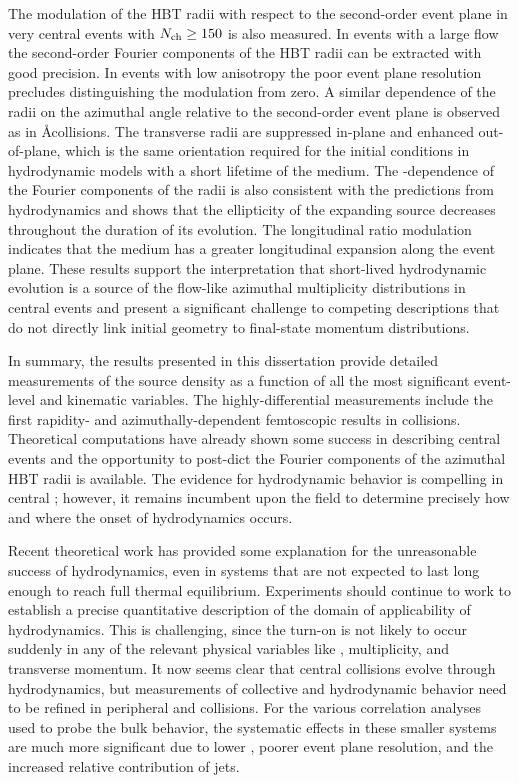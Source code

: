 The modulation of the \ac{HBT} radii with respect to the second-order event plane in very central \pPb events with $\mbox{$N_{\mathrm{ch}}$} \geq 150$ is also measured.
In events with a large flow the second-order Fourier components of the \ac{HBT} radii can be extracted with good precision.
In events with low anisotropy the poor event plane resolution precludes distinguishing the modulation from zero.
A similar dependence of the radii on the azimuthal angle relative to the second-order event plane is observed as in \AA collisions.
The transverse radii are suppressed in-plane and enhanced out-of-plane, which is the same orientation required for the initial conditions in hydrodynamic models with a short lifetime of the medium.
The \kt-dependence of the Fourier components of the radii is also consistent with the predictions from hydrodynamics and shows that the ellipticity of the expanding source decreases throughout the duration of its evolution.
The longitudinal ratio \Rlong modulation indicates that the medium has a greater longitudinal expansion along the event plane.
These results support the interpretation that short-lived hydrodynamic evolution is a source of the flow-like azimuthal multiplicity distributions in central \pPb events and present a significant challenge to competing descriptions that do not directly link initial geometry to final-state momentum distributions.

In summary, the results presented in this dissertation provide detailed measurements of the \pPb source density as a function of all the most significant event-level and kinematic variables.
The highly-differential measurements include the first rapidity- and azimuthally-dependent femtoscopic results in \pA collisions.
Theoretical computations have already shown some success in describing central \pPb events and the opportunity to post-dict the Fourier components of the azimuthal \ac{HBT} radii is available.
The evidence for hydrodynamic behavior is compelling in central \pPb; however, it remains incumbent upon the field to determine precisely how and where the onset of hydrodynamics occurs.


Recent theoretical work has provided some explanation for the unreasonable success of hydrodynamics, even in systems that are not expected to last long enough to reach full thermal equilibrium.
Experiments should continue to work to establish a precise quantitative description of the domain of applicability of hydrodynamics.
This is challenging, since the turn-on is not likely to occur suddenly in any of the relevant physical variables like \Npart, multiplicity, and transverse momentum.
It now seems clear that central \pPb collisions evolve through hydrodynamics, but measurements of collective and hydrodynamic behavior need to be refined in peripheral \pPb and \pp collisions.
For the various correlation analyses used to probe the bulk behavior, the systematic effects in these smaller systems are much more significant due to lower \Nch, poorer event plane resolution, and the increased relative contribution of jets.


